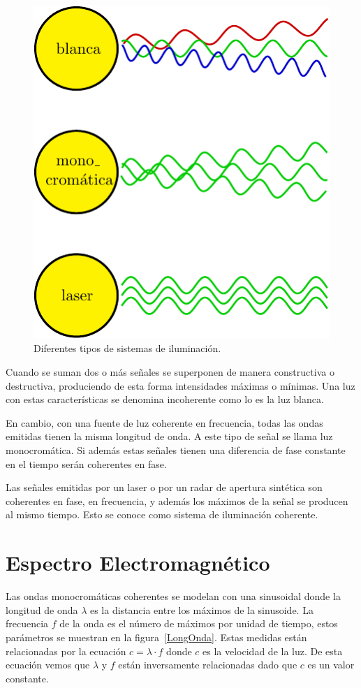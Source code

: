 \begin{figure}[hbt]
	\centering    
	\includegraphics[scale=0.7]{../../Figures/Tesis/Capitulo3/LuzCoherenteTico.pdf}
	\caption{\label{LuzCoherente}Diferentes tipos de sistemas de iluminación.}
\end{figure} 

Cuando se suman dos o más señales se superponen de manera constructiva o destructiva, produciendo de esta forma intensidades máximas o mínimas. Una luz con estas características se denomina incoherente como lo es la luz blanca.

En cambio, con una fuente de luz coherente en frecuencia, todas las ondas emitidas tienen la misma longitud de onda. A este tipo de señal se llama luz monocromática. Si además estas señales tienen una diferencia de fase constante en el tiempo serán coherentes en fase. 

Las señales emitidas por un laser o por un radar de apertura sintética son coherentes en fase, en frecuencia, y además los máximos de la señal se producen al mismo tiempo. Esto se conoce como sistema de iluminación coherente.

\section{Espectro Electromagnético}

Las ondas monocromáticas coherentes se modelan con una sinusoidal donde la longitud de onda $\lambda$ es la distancia entre los máximos de la sinusoide. La frecuencia $f$ de la onda es el número de máximos por unidad de tiempo, estos parámetros se muestran en la figura~\ref{LongOnda}. Estas medidas están relacionadas por la ecuación $c=\lambda \cdot f$ donde $c$ es la velocidad de la luz. De esta ecuación vemos que $\lambda$ y $f$ están inversamente relacionadas dado que $c$ es un valor constante.

